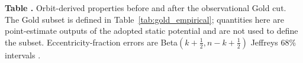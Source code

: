 \begin{center}
\label{tab:gold_dynamical}
\begin{minipage}{\columnwidth}
\small\textbf{Table \thetable.} Orbit-derived properties before and after
the observational Gold cut.  The Gold subset is defined in
Table~\ref{tab:gold_empirical}; quantities here are point-estimate outputs
of the adopted static potential and are not used to define the subset.
Eccentricity-fraction errors are Beta$(k+\tfrac{1}{2},n-k+\tfrac{1}{2})$
Jeffreys 68\% intervals \citep{Cameron2011}.
\end{minipage}
\vspace{0.4ex}

\scriptsize
\setlength{\tabcolsep}{4pt}
\end{center}

